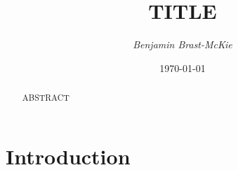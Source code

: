 \documentclass[11pt]{article}
\begin{document}
\title{\sc TITLE}
\author{\it Benjamin Brast-McKie} 
\date{\today}
\maketitle
\thispagestyle{empty}

\begin{abstract}
\noindent
ABSTRACT
\end{abstract}


\section{Introduction}\label{Intro}

\cite{Acharya2013}


\begin{footnotesize} %
\thispagestyle{empty} %
\end{footnotesize} %
\end{document}
